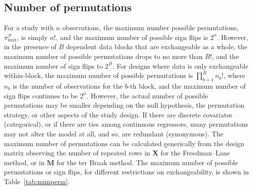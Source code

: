 \subsection{Number of permutations} 

For a study with $n$ observations, the maximum number possible permutations, $\pi^{\mathcal{P}}_{\text{max}}$, is simply $n!$, and the maximum number of possible sign flips is $2^n$. However, in the presence of $B$ dependent data blocks that are exchangeable as a whole, the maximum number of possible permutations drops to no more than $B!$, and the maximum number of sign flips to $2^B$. For designs where data is only exchangeable within-block, the maximum number of possible permutations is $\prod_{b=1}^{B} n_{b}!$, where $n_{b}$ is the number of observations for the $b$-th block, and the maximum number of sign flips continues to be $2^n$. However, the actual number of possible permutations may be smaller depending on the null hypothesis, the permutation strategy, or other aspects of the study design. If there are discrete covariates (categorical), or if there are ties among continuous regressors, many permutations may not alter the model at all, and so, are redundant (synonymous). The maximum number of permutations can be calculated generically from the design matrix observing the number of repeated rows in $\mathbf{X}$ for the Freedman--Lane method, or in $\mathbf{M}$ for the ter Braak method. The maximum number of possible permutations or sign flips, for different restrictions on exchangeability, is shown in Table~\ref{tab:numperm}.

